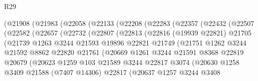 \begin{lexlean}{R29}
\begin{coremodule}
          (@21908
            (@21983
              (@22058
                (@22133
                  (@22208
                    (@22283
                      (@22357
                        (@22432
                          (@22507
                            (@22582
                              (@22657
                                (@22732
                                  (@22807
                                    (@22813
                                      (@22816
                                        (@19939 @22821)
                                        @21705
                                        (@21739
                                          @1263
                                          @3244
                                          @21593
                                          @19896
                                          @22821
                                          @21749
                                          (@21751
                                            @1262
                                            @3244
                                            @21592
                                            @8862
                                            @22820
                                            @21761
                                            (@20669
                                              @1261
                                              @3244
                                              @21591
                                              @8368
                                              @22819
                                              @20679
                                              (@20623
                                                @1259
                                                @103
                                                @21589
                                                @3244
                                                @22817
                                                @3074
                                                (@20630
                                                  @1258
                                                  @3409
                                                  @21588
                                                  (@7407 @14306)
                                                  @22817
                                                  (@20637
                                                    @1257
                                                    @3244
                                                    @3408

\end{coremodule}
\end{lexlean}
